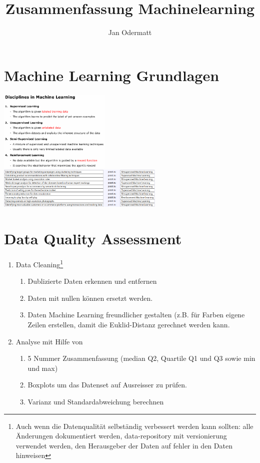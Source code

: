 \documentclass{article}
\author{Jan Odermatt}
\title{Zusammenfassung Machinelearning}
\begin{document}
\tableofcontents
\section{Machine Learning Grundlagen}
\includegraphics[width=0.4\textwidth]{disciplines_in_machine_learning.png}
\includegraphics[width=0.6\textwidth]{disciplines_matched.png}
\section{Data Quality Assessment}
	\begin{enumerate}
		\item Data Cleaning\footnote{Auch wenn die Datenqualität selbständig verbessert werden kann sollten: alle Änderungen dokumentiert werden, data-repository mit versionierung verwendet werden, den Herausgeber der Daten auf fehler in den Daten hinweisen}
		\begin{enumerate}
			\item Dublizierte Daten erkennen und entfernen
			\item Daten mit nullen können ersetzt werden.
			\item Daten Machine Learning freundlicher gestalten (z.B. für Farben eigene Zeilen erstellen, damit die Euklid-Distanz gerechnet werden kann.
		\end{enumerate}
		\item Analyse mit Hilfe von
		\begin{enumerate}
		\item 5 Nummer Zusammenfassung (median Q2, Quartile Q1 und Q3 sowie min und max)
		\item Boxplots um das Datenset auf Ausreisser zu prüfen.
		\item Varianz und Standardabweichung berechnen
		\end{enumerate}
	\end{enumerate}
\end{document}
